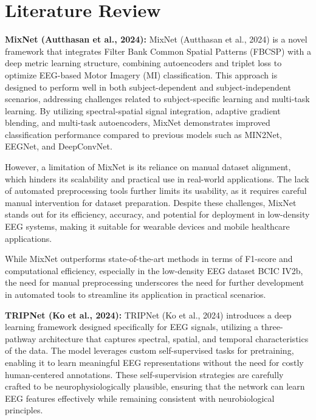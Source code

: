 \section{Literature Review}
\label{sec:literature-review}

\textbf{MixNet (Autthasan et al., 2024):}
MixNet (Autthasan et al., 2024) is a novel framework that integrates Filter Bank Common Spatial Patterns (FBCSP) with a deep metric learning structure, combining autoencoders and triplet loss to optimize EEG-based Motor Imagery (MI) classification. This approach is designed to perform well in both subject-dependent and subject-independent scenarios, addressing challenges related to subject-specific learning and multi-task learning. By utilizing spectral-spatial signal integration, adaptive gradient blending, and multi-task autoencoders, MixNet demonstrates improved classification performance compared to previous models such as MIN2Net, EEGNet, and DeepConvNet.

However, a limitation of MixNet is its reliance on manual dataset alignment, which hinders its scalability and practical use in real-world applications. The lack of automated preprocessing tools further limits its usability, as it requires careful manual intervention for dataset preparation. Despite these challenges, MixNet stands out for its efficiency, accuracy, and potential for deployment in low-density EEG systems, making it suitable for wearable devices and mobile healthcare applications.

While MixNet outperforms state-of-the-art methods in terms of F1-score and computational efficiency, especially in the low-density EEG dataset BCIC IV2b, the need for manual preprocessing underscores the need for further development in automated tools to streamline its application in practical scenarios.

\vspace{0.5em}
\textbf{TRIPNet (Ko et al., 2024):}
TRIPNet (Ko et al., 2024) introduces a deep learning framework designed specifically for EEG signals, utilizing a three-pathway architecture that captures spectral, spatial, and temporal characteristics of the data. The model leverages custom self-supervised tasks for pretraining, enabling it to learn meaningful EEG representations without the need for costly human-centered annotations. These self-supervision strategies are carefully crafted to be neurophysiologically plausible, ensuring that the network can learn EEG features effectively while remaining consistent with neurobiological principles.

